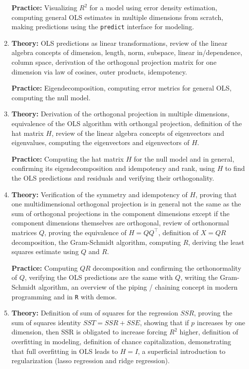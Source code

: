 \documentclass[12pt]{article}
\begin{document}
\begin{enumerate}[(1)]
\textbf{Practice:} Visualizing $R^2$ for a model using error density estimation, computing general OLS estimates in multiple dimensions from scratch, making predictions using the \texttt{predict} interface for modeling.

\item \textbf{Theory:} OLS predictions as linear transformations, review of the linear algebra concepts of dimension, length, norm, subspace, linear in/dependence, column space, derivation of the orthogonal projection matrix for one dimension via law of cosines, outer products, idempotency.

\textbf{Practice:} Eigendecomposition, computing error metrics for general OLS, computing the null model.

\item \textbf{Theory:} Derivation of the orthogonal projection in multiple dimensions, equivalence of the OLS algorithm with orthongal projection, definition of the hat matrix $H$, review of the linear algebra concepts of eigenvectors and eigenvalues, computing the eigenvectors and eigenvectors of $H$.

\textbf{Practice:} Computing the hat matrix $H$ for the null model and in general, confirming its eigendecomposition and idempotency and rank, using $H$ to find the OLS predictions and residuals and verifying their orthogonality.

\item \textbf{Theory:} Verification of the symmetry and idempotency of $H$, proving that one multidimensional orthogonal projection is in general not the same as the sum of orthogonal projections in the component dimensions except if the component dimensions themselves are orthogonal, review of orthonormal matrices $Q$, proving the equivalence of $H = QQ^\top$, definition of $X = QR$ decomposition, the Gram-Schmidt algorithm, computing $R$, deriving the least squares estimate using $Q$ and $R$.

\textbf{Practice:} Computing $QR$ decomposition and confirming the orthonormality of $Q$, verifying the OLS predictions are the same with $Q$, writing the Gram-Schmidt algorithm, an overview of the piping / chaining concept in modern programming and in \texttt{R} with demos. 

\item \textbf{Theory:} Definition of sum of squares for the regression $SSR$, proving the sum of squares identity $SST = SSR + SSE$, showing that if $p$ increases by one dimension, then SSR is obligated to increase forcing $R^2$ higher, definition of overfitting in modeling, definition of chance capitalization, demonstrating that full overfitting in OLS leads to $H = I$, a superficial introduction to regularization (lasso regression and ridge regression).


\end{enumerate}
\end{document}
